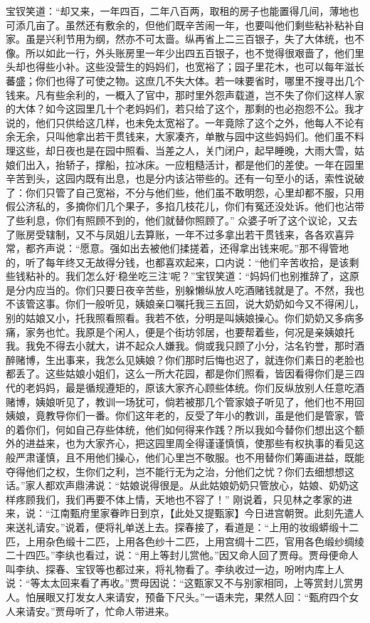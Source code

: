 \documentclass[12pt,oneside]{book}
\begin{document}
宝钗笑道：“却又来，一年四百，二年八百两，取租的房子也能置得几间，薄地也可添几亩了。虽然还有敷余的，但他们既辛苦闹一年，也要叫他们剩些粘补粘补自家。虽是兴利节用为纲，然亦不可太啬。纵再省上二三百银子，失了大体统，也不像。所以如此一行，外头账房里一年少出四五百银子，也不觉得很艰啬了，他们里头却也得些小补。这些没营生的妈妈们，也宽裕了；园子里花木，也可以每年滋长蕃盛；你们也得了可使之物。这庶几不失大体。若一味要省时，哪里不搜寻出几个钱来。凡有些余利的，一概入了官中，那时里外怨声载道，岂不失了你们这样人家的大体？如今这园里几十个老妈妈们，若只给了这个，那剩的也必抱怨不公。我才说的，他们只供给这几样，也未免太宽裕了。一年竟除了这个之外，他每人不论有余无余，只叫他拿出若干贯钱来，大家凑齐，单散与园中这些妈妈们。他们虽不料理这些，却日夜也是在园中照看、当差之人，关门闭户，起早睡晚，大雨大雪，姑娘们出入，抬轿子，撑船，拉冰床。一应粗糙活计，都是他们的差使。一年在园里辛苦到头，这园内既有出息，也是分内该沾带些的。还有一句至小的话，索性说破了：你们只管了自己宽裕，不分与他们些，他们虽不敢明怨，心里却都不服，只用假公济私的，多摘你们几个果子，多掐几枝花儿，你们有冤还没处诉。他们也沾带了些利息，你们有照顾不到的，他们就替你照顾了。”
众婆子听了这个议论，又去了账房受辖制，又不与凤姐儿去算账，一年不过多拿出若干贯钱来，各各欢喜异常，都齐声说：“愿意。强如出去被他们揉搓着，还得拿出钱来呢。”那不得管地的，听了每年终又无故得分钱，也都喜欢起来，口内说：“他们辛苦收拾，是该剩些钱粘补的。我们怎么好‘稳坐吃三注’呢？”宝钗笑道：“妈妈们也别推辞了，这原是分内应当的。你们只要日夜辛苦些，别躲懒纵放人吃酒赌钱就是了。不然，我也不该管这事。你们一般听见，姨娘亲口嘱托我三五回，说大奶奶如今又不得闲儿，别的姑娘又小，托我照看照看。我若不依，分明是叫姨娘操心。你们奶奶又多病多痛，家务也忙。我原是个闲人，便是个街坊邻居，也要帮着些，何况是亲姨娘托我。我免不得去小就大，讲不起众人嫌我。倘或我只顾了小分，沽名钓誉，那时酒醉赌博，生出事来，我怎么见姨娘？你们那时后悔也迟了，就连你们素日的老脸也都丢了。这些姑娘小姐们，这么一所大花园，都是你们照看，皆因看得你们是三四代的老妈妈，最是循规遵矩的，原该大家齐心顾些体统。你们反纵放别人任意吃酒赌博，姨娘听见了，教训一场犹可，倘若被那几个管家娘子听见了，他们也不用回姨娘，竟教导你们一番。你们这年老的，反受了年小的教训，虽是他们是管家，管的着你们，何如自己存些体统，他们如何得来作践？所以我如今替你们想出这个额外的进益来，也为大家齐心，把这园里周全得谨谨慎慎，使那些有权执事的看见这般严肃谨慎，且不用他们操心，他们心里岂不敬服。也不用替你们筹画进益，既能夺得他们之权，生你们之利，岂不能行无为之治，分他们之忧？你们去细想想这话。”家人都欢声鼎沸说：“姑娘说得很是。从此姑娘奶奶只管放心，姑娘、奶奶这样疼顾我们，我们再要不体上情，天地也不容了！”
刚说着，只见林之孝家的进来，说：“江南甄府里家眷昨日到京，【此处又提甄家】今日进宫朝贺。此刻先遣人来送礼请安。”说着，便将礼单送上去。探春接了，看道是：“上用的妆缎蟒缎十二匹，上用杂色缎十二匹，上用各色纱十二匹，上用宫绸十二匹，官用各色缎纱绸绫二十四匹。”李纨也看过，说：“用上等封儿赏他。”因又命人回了贾母。贾母便命人叫李纨、探春、宝钗等也都过来，将礼物看了。李纨收过一边，吩咐内库上人说：“等太太回来看了再收。”贾母因说：“这甄家又不与别家相同，上等赏封儿赏男人。怕展眼又打发女人来请安，预备下尺头。”一语未完，果然人回：“甄府四个女人来请安。”贾母听了，忙命人带进来。
\end{document}
